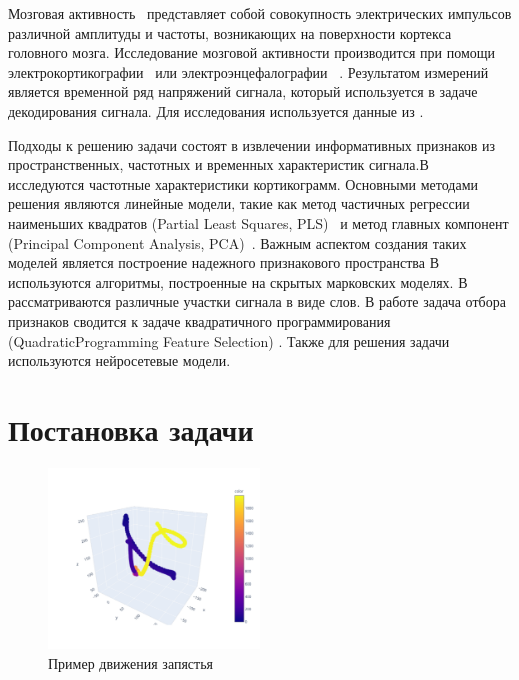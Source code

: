 \documentclass[12pt, twoside]{article}
\begin{document}
Мозговая активность~\cite{motrenko2018multi} представляет собой совокупность электрических импульсов различной амплитуды и частоты, возникающих на поверхности кортекса головного мозга. Исследование мозговой активности производится при помощи  электрокортикографии~\cite{hill2012recording} или  электроэнцефалографии~ \cite{aminoff2012electroencephalography}. Результатом измерений является временной ряд напряжений сигнала, который используется в задаче декодирования сигнала. Для исследования используется данные из \cite{chao2010long}.

 Подходы \cite{morishita2014brain, alexander2013traveling} к решению задачи состоят в извлечении информативных признаков из пространственных, частотных и временных характеристик сигнала.В~\cite{chin2007identification, eliseyev2014stable, loza2017unsupervised} исследуются частотные характеристики кортикограмм. Основными методами решения являются линейные модели, такие как метод частичных регрессии наименьших  квадратов (Partial Least Squares, PLS)~\cite{eliseyev2014stable,eliseyev2016penalized, rosipal2005overview} и метод главных компонент (Principal Component Analysis, PCA)~\cite{rosipal2005overview, eliseyev2016penalized}.
 Важным аспектом создания таких моделей является построение надежного
 признакового пространства
  В~\cite{zhao2014coupled} используются алгоритмы, построенные на скрытых марковских моделях. В~\cite{loza2017unsupervised, zhao2010ecog} рассматриваются различные участки сигнала в виде слов. В работе \cite{motrenko2018multi} задача отбора признаков сводится к задаче квадратичного программирования (QuadraticProgramming Feature Selection) \cite{rodriguez2010quadratic}. Также для решения задачи используются нейросетевые модели\cite{xie2018deep}. 
\newpage
\section{Постановка задачи}
\begin{figure}[]
	\centering
  	\includegraphics[width=0.5\textwidth]{../figs/newplot.pdf}
  	\caption{Пример движения запястья}
\end{figure}
\end{document}
